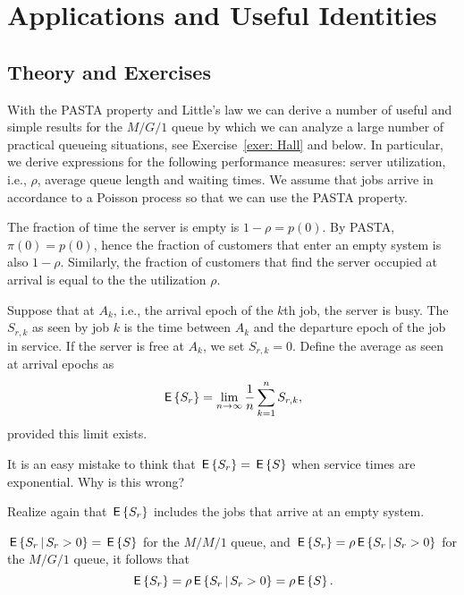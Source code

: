 \section{Applications and Useful Identities}
\label{sec:some-usef-ident}


\subsection*{Theory and Exercises}

With the PASTA property and Little's law we can derive a number of
useful and simple results for the $M/G/1$ queue by which we can analyze a large number of practical queueing situations, see Exercise~\ref{exer: Hall} and below. In particular, we derive expressions for  the following performance measures: server utilization, i.e., $\rho$, average queue length and waiting times. We assume that jobs arrive in accordance to a Poisson process so that we can use the PASTA property.


The fraction of time the server is empty is $1-\rho = p(0)$. By PASTA,
$\pi(0)=p(0)$, hence the fraction of customers that enter an empty
system is also $1-\rho$. Similarly, the fraction of customers that find the server occupied at arrival is equal to the the utilization $\rho$. 



Suppose that at $A_k$, i.e., the arrival epoch of the $k$th job, the
server is busy.  The  $S_{r,k}$ as seen by job
$k$ is the time between $A_k$ and the departure epoch of the job in
service. If the server is free at $A_k$, we set $S_{r,k}=0$.  Define
the average  as seen at arrival epochs as
\begin{equation*}
  \,\mathsf{E}\left\{S_r\right\} = \lim_{n\to\infty} \frac1n \sum_{k=1}^n S_{r,k},
\end{equation*}
provided this limit exists. 

\begin{exercise}
  It is an easy mistake to think that $\,\mathsf{E}\left\{S_r\right\} = \,\mathsf{E}\left\{S\right\}$ when service
  times are exponential. Why is this wrong?
  \begin{hint}
Realize again that $\,\mathsf{E}\left\{S_r\right\}$ includes the jobs that arrive at an empty system.
  \end{hint}
  \begin{solution}
    $\,\mathsf{E}\left\{S_r \,\middle|\, S_r>0\right\} = \,\mathsf{E}\left\{S\right\}$ for the $M/M/1$ queue, and
    $\,\mathsf{E}\left\{S_r\right\} = \rho \,\mathsf{E}\left\{S_r \,\middle|\, S_r>0\right\}$ for the $M/G/1$ queue, it
    follows that
  \begin{equation*}
 \,\mathsf{E}\left\{S_r\right\} = \rho \,\mathsf{E}\left\{S_r\,\middle|\, S_r>0\right\} = \rho \,\mathsf{E}\left\{S\right\}.
  \end{equation*}
  \end{solution}
\end{exercise}

